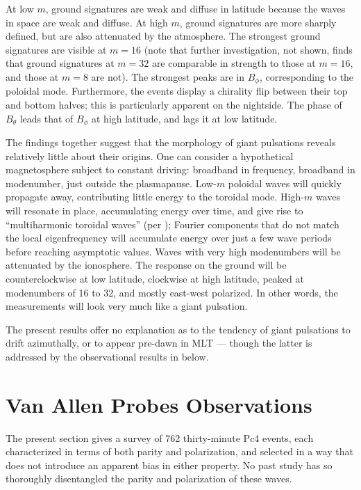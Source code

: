 \documentclass{article}
\newcommand{\azm}{\ensuremath{m}\xspace}
\begin{document}
At low \azm, ground signatures are weak and diffuse in latitude because the waves in space are weak and diffuse. At high \azm, ground signatures are more sharply defined, but are also attenuated by the atmosphere. The strongest ground signatures are visible at $\azm = 16$ (note that further investigation, not shown, finds that ground signatures at $\azm = 32$ are comparable in strength to those at $\azm = 16$, and those at $\azm = 8$ are not). The strongest peaks are in $B_\phi$, corresponding to the poloidal mode. Furthermore, the events display a chirality flip between their top and bottom halves; this is particularly apparent on the nightside. The phase of $B_\theta$ leads that of $B_\phi$ at high latitude, and lags it at low latitude.

The findings together suggest that the morphology of giant pulsations reveals relatively little about their origins. One can consider a hypothetical magnetosphere subject to constant driving: broadband in frequency, broadband in modenumber, just outside the plasmapause. Low-\azm poloidal waves will quickly propagate away, contributing little energy to the toroidal mode. High-\azm waves will resonate in place, accumulating energy over time, and give rise to ``multiharmonic toroidal waves'' (per \cite{takahashi_2011}); Fourier components that do not match the local eigenfrequency will accumulate energy over just a few wave periods before reaching asymptotic values. Waves with very high modenumbers will be attenuated by the ionosphere. The response on the ground will be counterclockwise at low latitude, clockwise at high latitude, peaked at modenumbers of 16 to 32, and mostly east-west polarized. In other words, the measurements will look very much like a giant pulsation.

The present results offer no explanation as to the tendency of giant pulsations to drift azimuthally, or to appear pre-dawn in MLT --- though the latter is addressed by the observational results in below.


\section{Van Allen Probes Observations}

The present section gives a survey of 762 thirty-minute Pc4 events, each characterized in terms of both parity and polarization, and selected in a way that does not introduce an apparent bias in either property. No past study has so thoroughly disentangled the parity and polarization of these waves.
\end{document}
